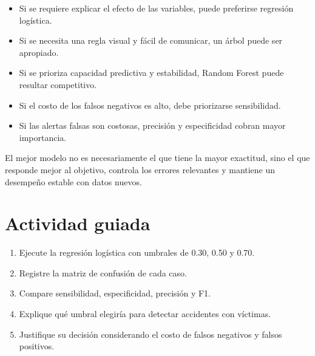 \documentclass[
  spanish,
  10.5pt,
  letterpaper,
  openany,
  headings=big]{scrbook}
\providecommand{\tightlist}{%
  \setlength{\itemsep}{0pt}\setlength{\parskip}{0pt}}
\begin{document}
\begin{itemize}
\tightlist
\item
  Si se requiere explicar el efecto de las variables, puede preferirse
  regresión logística.
\item
  Si se necesita una regla visual y fácil de comunicar, un árbol puede
  ser apropiado.
\item
  Si se prioriza capacidad predictiva y estabilidad, Random Forest puede
  resultar competitivo.
\item
  Si el costo de los falsos negativos es alto, debe priorizarse
  sensibilidad.
\item
  Si las alertas falsas son costosas, precisión y especificidad cobran
  mayor importancia.
\end{itemize}

\begin{tcolorbox}[enhanced jigsaw, arc=.35mm, bottomrule=.15mm, bottomtitle=1mm, breakable, colback=white, colbacktitle=quarto-callout-important-color!10!white, colframe=quarto-callout-important-color-frame, coltitle=black, left=2mm, leftrule=.75mm, opacityback=0, opacitybacktitle=0.6, rightrule=.15mm, title=\textcolor{quarto-callout-important-color}{\faExclamation}\hspace{0.5em}{Principio fundamental}, titlerule=0mm, toprule=.15mm, toptitle=1mm]

El mejor modelo no es necesariamente el que tiene la mayor exactitud,
sino el que responde mejor al objetivo, controla los errores relevantes
y mantiene un desempeño estable con datos nuevos.

\end{tcolorbox}

\section{Actividad guiada}\label{actividad-guiada}

\begin{enumerate}
\def\labelenumi{\arabic{enumi}.}
\tightlist
\item
  Ejecute la regresión logística con umbrales de 0.30, 0.50 y 0.70.
\item
  Registre la matriz de confusión de cada caso.
\item
  Compare sensibilidad, especificidad, precisión y F1.
\item
  Explique qué umbral elegiría para detectar accidentes con víctimas.
\item
  Justifique su decisión considerando el costo de falsos negativos y
  falsos positivos.
\end{enumerate}
\end{document}
